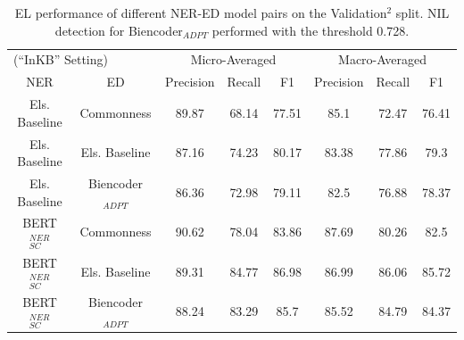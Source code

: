 \documentclass{report}
\theoremstyle{definition}
\theoremstyle{remark}
\begin{document}
\begin{table}
    \vspace{0.5cm}\begin{tabular}{c c c c c| c c c}
    \multicolumn{2}{l}{(``InKB'' Setting)}&\multicolumn{3}{c|}{Micro-Averaged}&\multicolumn{3}{c}{Macro-Averaged} \\
    NER & ED &Precision&Recall&F1&Precision&Recall&F1\\
    \hline
    Els. Baseline & Commonness & 89.87	&68.14&	77.51&	85.1	&72.47&	76.41\\
    Els. Baseline & Els. Baseline & 87.16	&74.23&	80.17	&83.38	&77.86&	79.3\\
    Els. Baseline & Biencoder$_{ADPT}$ &86.36	&72.98&	79.11&	82.5	&76.88&	78.37\\
    BERT$_{SC}^{NER}$ & Commonness & 90.62	&78.04&	83.86	&87.69	&80.26&	82.5\\
    BERT$_{SC}^{NER}$ & Els. Baseline & 89.31	&84.77&	86.98	&86.99	&86.06&	85.72\\
    BERT$_{SC}^{NER}$ & Biencoder$_{ADPT}$ &88.24	&83.29&	85.7	&85.52	&84.79&	84.37\\
    \end{tabular}
    \caption{EL performance of different NER-ED model pairs on the Validation$^2$ split. NIL detection for Biencoder$_{ADPT}$ performed with the threshold 0.728.}
    \label{tab:elresultsvalid}
\end{table}
\end{document}
